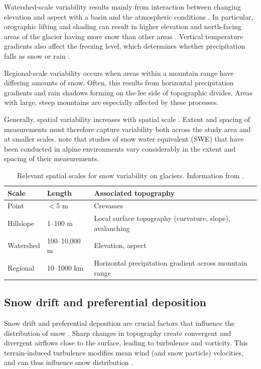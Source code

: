 \documentclass{sfuthesis}
\begin{document}
Watershed-scale variability results mainly from interaction between changing elevation and aspect with a basin and the atmospheric conditions \citep{Clark2011}. In particular, orographic lifting and shading can result in higher elevation and north-facing areas of the glacier having more snow than other areas \citep{Mott2008, Sold2013}. Vertical temperature gradients also affect the freezing level, which determines whether precipitation falls as snow or rain \citep{Bloschl1991}. 

Regional-scale variability occurs when areas within a mountain range have differing amounts of snow. Often, this results from horizontal precipitation gradients and rain shadows forming on the lee side of topographic divides. Areas with large, steep mountains are especially affected by these processes.

Generally, spatial variability increases with spatial scale \citep{Clark2011}. Extent and spacing of measurements must therefore capture variability both across the study area and at smaller scales. \cite{Clark2011} note that studies of snow water equivalent (SWE) that have been conducted in alpine environments vary considerably in the extent and spacing of their measurements. 

\begin{table}
\centering
\caption[Relevant spatial scales for snow variability on glaciers]{ Relevant spatial scales for snow variability on glaciers. Information from \cite{Clark2011}.}
\label{scale}
\begin{tabular}{lll}
\textbf{Scale} & \textbf{Length} & \textbf{Associated topography}                     \\ \hline
Point          & $<$5 m         & Crevasses                                               \\
Hillslope      & 1--100 m        & Local surface topography (curvature, slope), avalanching        \\
Watershed      & 100--10,000 m   & Elevation, aspect                                       \\
Regional       & 10--1000 km     & Horizontal precipitation gradient across mountain range
\end{tabular}
\end{table}

\subsection{Snow drift and preferential deposition}
Snow drift and preferential deposition are crucial factors that influence the distribution of snow \citep{Lehning2008, Winstral2002, Clark2011}. Sharp changes in topography create convergent and divergent airflows close to the surface, leading to turbulence and vorticity. This terrain-induced turbulence modifies mean wind (and snow particle) velocities, and can thus influence snow distribution \citep{Mott2008, Lehning2008, Dadic2010}.
\end{document}
